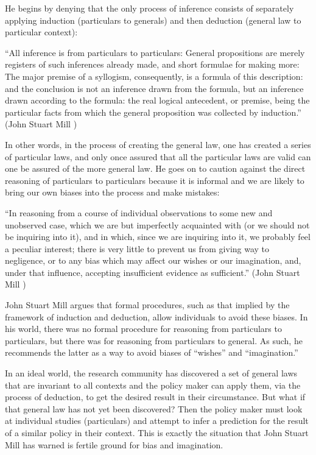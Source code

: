 \documentclass[a4paper,12pt]{article}
\begin{document}
He begins by denying that the only process of inference consists of separately applying induction (particulars to generals) and then deduction (general law to particular context):

\begin{displayquote}
  ``All inference is from particulars to particulars: General propositions are merely registers of such inferences already made, and short formulae for making more: The major premise of a syllogism, consequently, is a formula of this description: and the conclusion is not an inference drawn from the formula, but an inference drawn according to the formula: the real logical antecedent, or premise, being the particular facts from which the general proposition was collected by induction.''  (John Stuart Mill  )
\end{displayquote}

In other words, in the process of creating the general law, one has created a series of particular laws, and only once assured that all the particular laws are valid can one be assured of the more general law. He goes on to caution against the direct reasoning of particulars to particulars because it is informal and we are likely to bring our own biases into the process and make mistakes: 
%
\begin{displayquote}
``In reasoning from a course of individual observations to some new and unobserved case, which we are but imperfectly acquainted with (or we should not be inquiring into it), and in which, since we are inquiring into it, we probably feel a peculiar interest; there is very little to prevent us from giving way to negligence, or to any bias which may affect our wishes or our imagination, and, under that influence, accepting insufficient evidence as sufficient.'' (John Stuart Mill )  
\end{displayquote}

John Stuart Mill argues that formal procedures, such as that implied by the framework of induction and deduction, allow individuals to avoid these biases. In his world, there was no formal procedure for reasoning from particulars to particulars, but there was for reasoning from particulars to general. As such, he recommends the latter as a way to avoid biases of ``wishes'' and ``imagination.''

In an ideal world, the research community has discovered a set of general laws that are invariant to all contexts and the policy maker can apply them, via the process of deduction, to get the desired result in their circumstance. But what if that general law has not yet been discovered? Then the policy maker must look at individual studies (particulars) and attempt to infer a prediction for the result of a similar policy in their context. This is exactly the situation that John Stuart Mill has warned is fertile ground for bias and imagination. 
\end{document}
